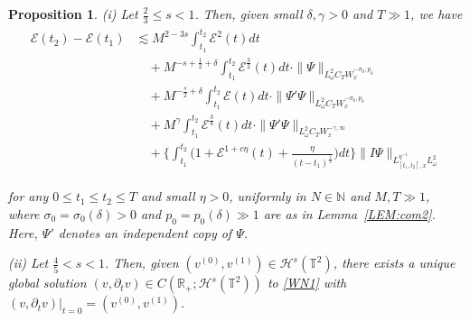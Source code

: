 \documentclass[letterpaper, 11pt,  reqno]{amsart}
\newtheorem{proposition}[theorem]{Proposition}
\newcommand{\1}{\hspace{0.5mm}\text{I}\hspace{0.2mm}}
\newcommand{\noi}{\noindent}
\newcommand{\R}{\mathbb{R}}
\newcommand{\T}{\mathbb{T}}
\newcommand{\N}{\mathbb{N}}
\renewcommand{\H}{\mathcal{H}}
\newcommand{\om}{\omega}
\newcommand{\dl}{\delta}
\newcommand{\dt}{\partial_t}
\newcommand{\les}{\lesssim}
\newcommand{\g}{\gamma}
\newcommand{\EE}{\mathcal{E}}
\renewcommand{\o}{\omega}
\numberwithin{equation}{section}
\numberwithin{theorem}{section}
\begin{document}
\begin{proposition}\label{PROP:CM0}
\textup{(i)}
Let $\frac 23 \le s < 1$.
Then, given small $\dl, \g > 0$ and $T \gg1$, 
we have 
\begin{align} 
\begin{split}
 \EE(t_2)  - \EE(t_1) 
&  \les M^{2 - 3s} \int_{t_1}^{t_2} \EE^2 (t) d t \\ 
&\quad 
+  M^{- s + \frac 12 + \dl} 
  \int_{t_1}^{t_2} 
\EE ^{\frac 32} (t) d t
\cdot \| \Psi \|_{L_\om^2 C_T W_x^{- \sigma_0, p_0}} \\
& \quad
+  M^{- \frac {s}{2} + \dl} 
\int_{t_1}^{t_2} \EE(t) d t 
\cdot \| \Psi' \Psi \|_{L_\om^2 C_T W_x^{- \sigma_0, p_0}} \\
&\quad 
+ M^{\g} \int_{t_1}^{t_2} \EE^{\frac 34}(t) d t
\cdot 
\| \Psi' \Psi  \|_{L_\om^2 C_T W_x^{- \g, \infty}} 
\\
&\quad 
+ \bigg\{\int_{t_1}^{t_2}  
\Big(1 + \EE^{1 + c\eta} (t) + \frac {\eta}{(t - t_1)^{\frac 12}} \Big)d t\bigg\}
\| I \Psi \|_{L^{\eta^{-1}}_{[t_1, t_2], x}L^2_\o } 
\end{split}
\label{WW2a}
\end{align} 

\noi 
for any $0\leq t_1 \leq t_2 \leq T$
and small $ \eta > 0$, 
uniformly in $N \in \N$ and $M, T\gg1$, 
where
$\sigma_0 = \sigma_0 (\dl) >0$ and $p_0 = p_0 (\dl) \gg 1$ are as  in Lemma~\ref{LEM:com2}.
Here, $\Psi'$ denotes an independent copy of $\Psi$.


\medskip

\noi
\textup{(ii)}
Let $ \frac 45 < s < 1$.
Then, given $(v^{(0)}, v^{(1)}) \in \H^s(\T^2)$, 
there exists a unique global solution $(v, \dt v) 
\in C(\R_+; \H^s(\T^2))$
to 
\eqref{WN1} with $(v, \dt v) |_{t = 0} = (v^{(0)}, v^{(1)})$.





\end{proposition}
\end{document}
